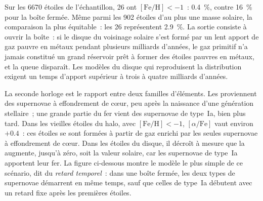 Sur les 6670 étoiles de l'échantillon, 26 ont $[\mathrm{Fe/H}] < -1$~:
\qty{0.4}{\percent}, contre \qty{16}{\percent} pour la boîte fermée.
Même parmi les 902 étoiles d'au plus une masse solaire, la comparaison la plus
équitable~: les 26 représentent \qty{2.9}{\percent}. La sortie consiste à ouvrir la
boîte~: si le disque du voisinage solaire s'est formé par un lent apport
de gaz pauvre en métaux pendant plusieurs milliards d'années, le gaz primitif
n'a jamais constitué un grand réservoir prêt à former des étoiles pauvres en
métaux, et la queue disparaît. Les modèles du disque qui reproduisent la
distribution exigent un temps d'apport supérieur à trois à quatre milliards d'années.

La seconde horloge est le rapport entre deux familles d'éléments. Les 
proviennent des supernovae à effondrement de cœur, peu après la naissance
d'une génération stellaire~; une grande partie du fer vient des supernovae de type~Ia,
bien plus tard. Dans les vieilles étoiles du halo, avec $[\mathrm{Fe/H}] < -1$,
$[\alpha/\mathrm{Fe}]$ vaut environ $+0.4$~: ces étoiles se sont formées à partir de gaz
enrichi par les seules supernovae à effondrement de cœur. Dans les étoiles du disque, il décroît
à mesure que la  augmente, jusqu'à zéro, soit la valeur solaire, car les
supernovae de type~Ia apportent leur fer. La figure ci-dessous montre le modèle le plus simple
de ce scénario, dit du \emph{retard temporel}~: dans une boîte fermée, les deux
types de supernovae démarrent en même temps, sauf que celles de type~Ia débutent avec un retard fixe
après les premières étoiles.

